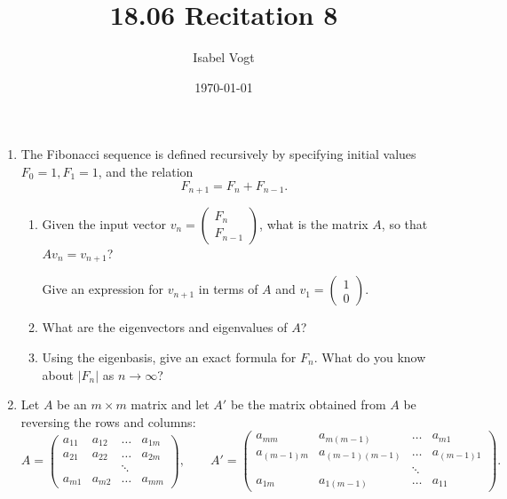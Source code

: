 \documentclass[11pt]{article}
\title{18.06 Recitation 8}
\author{Isabel Vogt}
\date{\today}                                           %
\begin{document}
\maketitle

\begin{enumerate}

\item The Fibonacci sequence is defined recursively by specifying initial values $F_0=1,  F_1 = 1$, and the relation
\[ F_{n+1} = F_n + F_{n-1}. \]
\begin{enumerate}
\item Given the input vector $v_n = \begin{pmatrix} F_n \\ F_{n-1} \end{pmatrix}$, what is the matrix $A$, so that $Av_n = v_{n+1}$?

Give an expression for $v_{n+1}$ in terms of $A$ and $v_1 = \begin{pmatrix} 1 \\ 0 \end{pmatrix}$.

\item What are the eigenvectors and eigenvalues of $A$?

\item Using the eigenbasis, give an exact formula for $F_n$.  What do you know about $|F_n|$ as $n \to \infty$?

\end{enumerate}

\item Let $A$ be an $m \times m$ matrix and let $A'$ be the matrix obtained from $A$ be reversing the rows and columns:
\[ A = \begin{pmatrix} a_{11} & a_{12} & \dots & a_{1m} \\ a_{21} & a_{22} & \dots & a_{2m} \\  & & \ddots & \\ a_{m1} & a_{m2} & \dots & a_{mm} \end{pmatrix}, \qquad A' = \begin{pmatrix} a_{mm} & a_{m(m-1)} & \dots & a_{m1} \\ a_{(m-1)m} & a_{(m-1)(m-1)} & \dots & a_{(m-1)1} \\  & & \ddots & \\ a_{1m} & a_{1(m-1)} & \dots & a_{11} \end{pmatrix}. \]


\end{enumerate}
\end{document}
